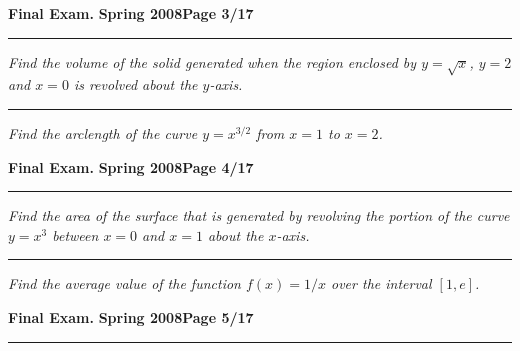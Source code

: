 \documentclass[12pt]{article}
\begin{document}
\hfill{\large\bf Final Exam.}\hfill{\large\bf
  Spring 2008}\hfill{\large\bf Page 3/17}\hrule

\bigskip
{\problem[10 pts] \em Find the volume of the solid generated when the region enclosed by $y=\sqrt{x}$, $y=2$ and $x=0$ is revolved about the $y$-axis.}
\vspace{8.5cm}
\begin{flushright}
\end{flushright}
\hrule
{\problem[10 pts] \em Find the arclength of the curve $y=x^{3/2}$ from $x=1$ to $x=2$.}
\vspace{8.5cm}
\begin{flushright}
\end{flushright}
\newpage

\hfill{\large\bf Final Exam.}\hfill{\large\bf
  Spring 2008}\hfill{\large\bf Page 4/17}\hrule

\bigskip
{\problem[10 pts] \em Find the area of the surface that is generated by revolving the portion of the curve $y=x^3$ between $x=0$ and $x=1$ about the $x$-axis.}
\vspace{8.5cm}
\begin{flushright}
\end{flushright}
\hrule
{\problem[10 pts] \em Find the average value of the function $f(x) = 1/x$ over the interval $[1,e]$.}
\vspace{8.5cm}
\begin{flushright}
\end{flushright}
\newpage

\hfill{\large\bf Final Exam.}\hfill{\large\bf
  Spring 2008}\hfill{\large\bf Page 5/17}\hrule
\end{document}
